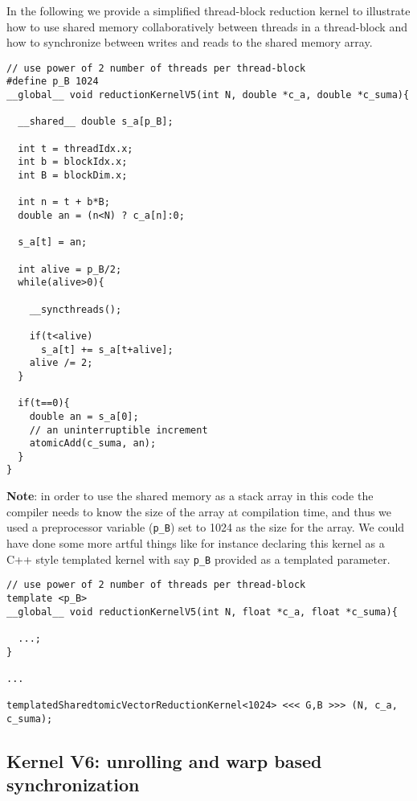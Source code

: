 In the following we provide a simplified thread-block reduction kernel to illustrate how to use shared memory collaboratively between threads in a thread-block and how to synchronize between writes and reads to the shared memory array. 

\begin{verbatim}
// use power of 2 number of threads per thread-block
#define p_B 1024
__global__ void reductionKernelV5(int N, double *c_a, double *c_suma){

  __shared__ double s_a[p_B];

  int t = threadIdx.x;
  int b = blockIdx.x;
  int B = blockDim.x;

  int n = t + b*B;
  double an = (n<N) ? c_a[n]:0;

  s_a[t] = an;

  int alive = p_B/2;
  while(alive>0){

    __syncthreads();

    if(t<alive)
      s_a[t] += s_a[t+alive];
    alive /= 2;
  }

  if(t==0){
    double an = s_a[0];
    // an uninterruptible increment   
    atomicAdd(c_suma, an);
  }
}

\end{verbatim}

{\bf Note}: in order to use the shared memory as a stack array in this code the compiler needs to know the size of the array at compilation time, and thus we used a preprocessor variable (\texttt{p\_B}) set to 1024 as the size for the array. We could have done some more artful things like for instance declaring this kernel as a C++ style templated kernel with say \texttt{p\_B} provided as a templated parameter.

\begin{verbatim}
// use power of 2 number of threads per thread-block
template <p_B>
__global__ void reductionKernelV5(int N, float *c_a, float *c_suma){

  ...;
}

...

templatedSharedtomicVectorReductionKernel<1024> <<< G,B >>> (N, c_a, c_suma);
\end{verbatim}

\subsection{Kernel  V6: unrolling and warp based synchronization}

